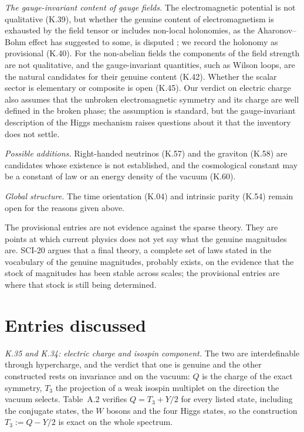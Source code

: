 \documentclass{situationist-preprint}
\begin{document}
\emph{The gauge-invariant content of gauge fields.} The electromagnetic potential is not qualitative (K.39), but whether the genuine content of electromagnetism is exhausted by the field tensor or includes non-local holonomies, as the Aharonov--Bohm effect has suggested to some, is disputed \citep{Healey2007}; we record the holonomy as provisional (K.40). For the non-abelian fields the components of the field strength are not qualitative, and the gauge-invariant quantities, such as Wilson loops, are the natural candidates for their genuine content (K.42). Whether the scalar sector is elementary or composite is open (K.45). Our verdict on electric charge also assumes that the unbroken electromagnetic symmetry and its charge are well defined in the broken phase; the assumption is standard, but the gauge-invariant description of the Higgs mechanism raises questions about it that the inventory does not settle.

\emph{Possible additions.} Right-handed neutrinos (K.57) and the graviton (K.58) are candidates whose existence is not established, and the cosmological constant may be a constant of law or an energy density of the vacuum (K.60).

\emph{Global structure.} The time orientation (K.04) and intrinsic parity (K.54) remain open for the reasons given above.

The provisional entries are not evidence against the sparse theory. They are points at which current physics does not yet say what the genuine magnitudes are. SCI-20 argues that a final theory, a complete set of laws stated in the vocabulary of the genuine magnitudes, probably exists, on the evidence that the stock of magnitudes has been stable across scales; the provisional entries are where that stock is still being determined.

\section{Entries discussed}\label{s:entries}

\emph{K.35 and K.34: electric charge and isospin component.} The two are interdefinable through hypercharge, and the verdict that one is genuine and the other constructed rests on invariance and on the vacuum: $Q$ is the charge of the exact symmetry, $T_3$ the projection of a weak isospin multiplet on the direction the vacuum selects. Table~A.2 verifies $Q = T_3 + Y/2$ for every listed state, including the conjugate states, the $W$ bosons and the four Higgs states, so the construction $T_3 := Q - Y/2$ is exact on the whole spectrum.
\end{document}
